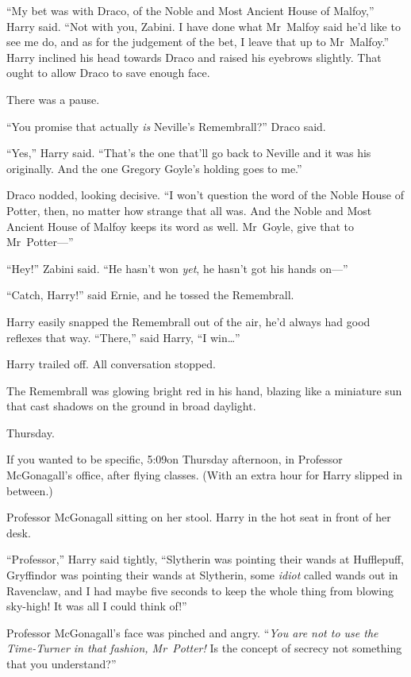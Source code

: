 “My bet was with Draco, of the Noble and Most Ancient House of Malfoy,” Harry said. “Not with you, Zabini. I have done what Mr~Malfoy said he’d like to see me do, and as for the judgement of the bet, I leave that up to Mr~Malfoy.” Harry inclined his head towards Draco and raised his eyebrows slightly. That ought to allow Draco to save enough face.

There was a pause.

“You promise that actually \emph{is} Neville’s Remembrall?” Draco said.

“Yes,” Harry said. “That’s the one that’ll go back to Neville and it was his originally. And the one Gregory Goyle’s holding goes to me.”

Draco nodded, looking decisive. “I won’t question the word of the Noble House of Potter, then, no matter how strange that all was. And the Noble and Most Ancient House of Malfoy keeps its word as well. Mr~Goyle, give that to Mr~Potter—”

“Hey!” Zabini said. “He hasn’t won \emph{yet}, he hasn’t got his hands on—”

“Catch, Harry!” said Ernie, and he tossed the Remembrall.

Harry easily snapped the Remembrall out of the air, he’d always had good reflexes that way. “There,” said Harry, “I win…”

Harry trailed off. All conversation stopped.

The Remembrall was glowing bright red in his hand, blazing like a miniature sun that cast shadows on the ground in broad daylight.

\later

Thursday.

If you wanted to be specific, 5:09\pm on Thursday afternoon, in Professor McGonagall’s office, after flying classes. (With an extra hour for Harry slipped in between.)

Professor McGonagall sitting on her stool. Harry in the hot seat in front of her desk.

“Professor,” Harry said tightly, “Slytherin was pointing their wands at Hufflepuff, Gryffindor was pointing their wands at Slytherin, some \emph{idiot} called wands out in Ravenclaw, and I had maybe five seconds to keep the whole thing from blowing sky-high! It was all I could think of!”

Professor McGonagall’s face was pinched and angry. “\emph{You are not to use the Time-Turner in that fashion, Mr~Potter!} Is the concept of secrecy not something that you understand?”

